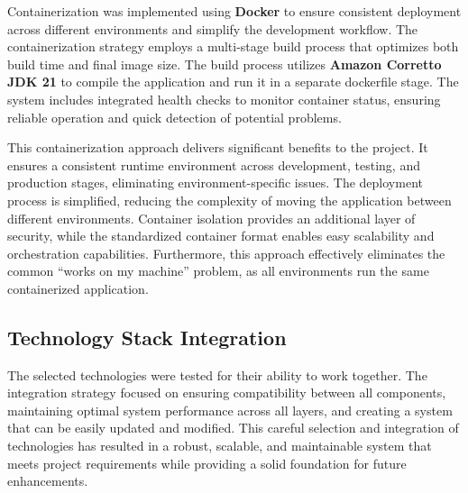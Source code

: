 Containerization was implemented using \textbf{Docker} to ensure consistent deployment across different environments and simplify the development workflow.
The containerization strategy employs a multi-stage build process that optimizes both build time and final image size.
The build process utilizes \textbf{Amazon Corretto JDK 21} to compile the application and run it in a separate dockerfile stage.
The system includes integrated health checks to monitor container status, ensuring reliable operation and quick detection of potential problems.

This containerization approach delivers significant benefits to the project.
It ensures a consistent runtime environment across development, testing, and production stages, eliminating environment-specific issues.
The deployment process is simplified, reducing the complexity of moving the application between different environments.
Container isolation provides an additional layer of security, while the standardized container format enables easy scalability and orchestration capabilities.
Furthermore, this approach effectively eliminates the common ``works on my machine'' problem, as all environments run the same containerized application.

\subsection{Technology Stack Integration}\label{subsec:integration}

The selected technologies were tested for their ability to work together.
The integration strategy focused on ensuring compatibility between all components, maintaining optimal system performance across all layers, and creating a system that can be easily updated and modified.
This careful selection and integration of technologies has resulted in a robust, scalable, and maintainable system that meets project requirements while providing a solid foundation for future enhancements.
